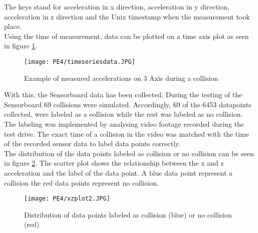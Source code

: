 The keys stand for acceleration in x direction, acceleration in y direction, acceleration in z direction and the Unix timestamp when the measurement took place. \\
Using the time of measurement, data can be plotted on a time axis plot as seen in figure \ref{fig:timeaxis}.

\begin{figure}[h]
\centering
\texttt{[image: PE4/timeseriesdata.JPG]}
\caption{Example of measured accelerations on 3 Axis during a collision }
\label{fig:timeaxis}
\end{figure}

With this, the Sensorboard data has been collected. During the testing of the Sensorboard 69 collisions were simulated. Accordingly, 69 of the 6453 datapoints collected,  were labeled as a collision while the rest was labeled  as no collision. The labeling was implemented by analysing video footage recorded during the test drive. The exact time of a collision in the video was matched with the time of the recorded sensor data to label data points correctly.\\
The distribution of the data points labeled as collision or no collision can be seen in figure \ref{fig:xyscatter}. The scatter plot shows the relationship between the x and z acceleration and the label of the data point. A blue data point represent a collision the red data points represent no collision.

\begin{figure}[h]
\centering
\texttt{[image: PE4/xzplot2.JPG]}
\caption{Distribution of data points labeled as collision (blue) or no collision (red)}
\label{fig:xyscatter}
\end{figure}

